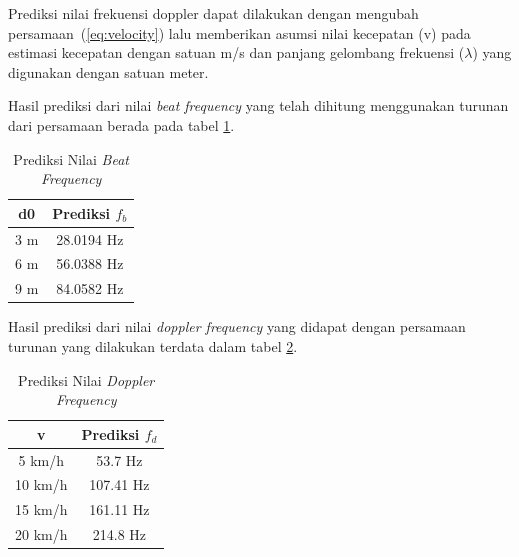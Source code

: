 Prediksi nilai frekuensi doppler dapat dilakukan dengan mengubah persamaan~(\ref{eq:velocity}) lalu memberikan asumsi nilai kecepatan (v) pada estimasi kecepatan dengan satuan m/s dan panjang gelombang frekuensi ($\lambda$) yang digunakan dengan satuan meter. 



Hasil prediksi dari nilai \textit{beat frequency} yang telah dihitung menggunakan turunan dari persamaan berada pada tabel \ref{tab:predFbeat}.

\begin{center}
	\begin{longtable}{|c|c|}
		\caption{Prediksi Nilai \textit{Beat Frequency}}
		\label{tab:predFbeat}\\
		\hline
		d0 & Prediksi $f_{b}$  \\
		\hline
		3 m & 28.0194 Hz\\
		\hline
		6 m & 56.0388 Hz\\
		\hline
		9 m & 84.0582 Hz\\
		\hline
	\end{longtable}
\end{center}

Hasil prediksi dari nilai \textit{doppler frequency} yang didapat dengan persamaan turunan yang dilakukan terdata dalam tabel \ref{tab:predFdopp}.

\begin{center}
	\begin{longtable}{|c|c|}
		\caption{Prediksi Nilai \textit{Doppler Frequency}}
		\label{tab:predFdopp}\\
		\hline
		v & Prediksi $f_{d}$  \\
		\hline
		5 km/h & 53.7 Hz\\
		\hline
		10 km/h & 107.41 Hz\\
		\hline
		15 km/h & 161.11 Hz\\
		\hline
		20 km/h & 214.8 Hz\\
		\hline
	\end{longtable}
\end{center}
